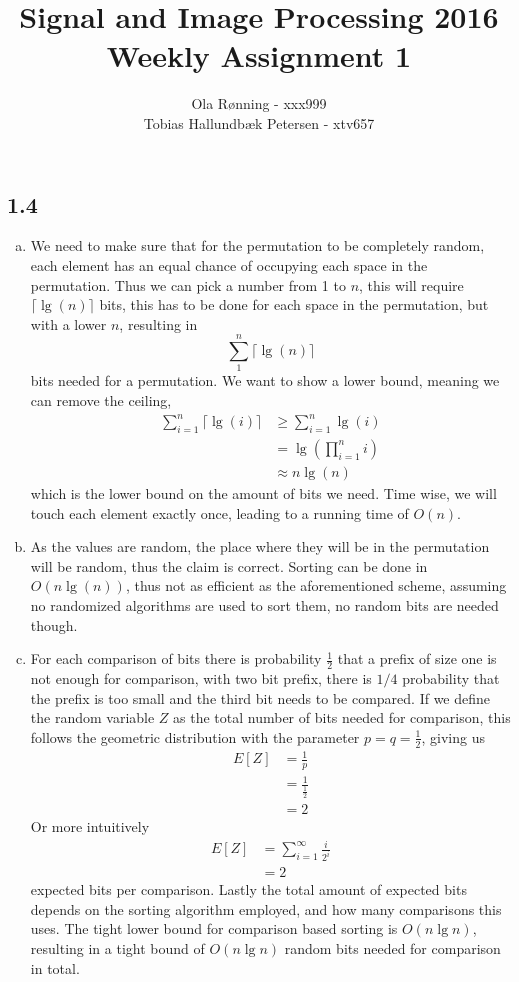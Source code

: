 \documentclass[a4paper]{article}
\title{Signal and Image Processing 2016\\Weekly Assignment 1}
\author{Ola Rønning - xxx999\\Tobias Hallundbæk Petersen - xtv657}
\begin{document}
\maketitle
\subsection*{1.4}
\begin{enumerate}[(a)]
  \item We need to make sure that for the permutation to be completely random, each element has an equal chance of occupying each space in the permutation. Thus we can pick a number from 1 to $n$, this will require $\lceil \lg(n)\rceil$ bits, this has to be done for each space in the permutation, but with a lower $n$, resulting in
    $$
    \sum^n_1 \lceil \lg(n) \rceil
    $$
    bits needed for a permutation. We want to show a lower bound, meaning we can remove the ceiling,
    \begin{align*}
      \sum^n_{i=1} \lceil \lg(i) \rceil &\geq \sum^n_{i=1} \lg(i)\\
                                        &= \lg\left(\prod_{i=1}^n i\right)\\
                                        &\approx n\lg(n)
    \end{align*}
    which is the lower bound on the amount of bits we need. Time wise, we will touch each element exactly once, leading to a running time of $O(n)$.
  \item As the values are random, the place where they will be in the permutation will be random, thus the claim is correct. Sorting can be done in $O(n\lg(n))$, thus not as efficient as the aforementioned scheme, assuming no randomized algorithms are used to sort them, no random bits are needed though.
  \item
    For each comparison of bits there is probability $\frac{1}{2}$ that a prefix of size one is not enough for comparison, with two bit prefix, there is $1/4$ probability that the prefix is too small and the third bit needs to be compared. If we define the random variable $Z$ as the total number of bits needed for comparison, this follows the geometric distribution with the parameter $p = q = \frac{1}{2}$, giving us
    \begin{align*}
      E[Z] &= \frac{1}{p}\\
           &= \frac{1}{\frac{1}{2}}\\
           &= 2
    \end{align*}
    Or more intuitively
    \begin{align*}
      E[Z] &= \sum_{i=1}^\infty \frac{i}{2^i}\\
           &= 2
    \end{align*}
    expected bits per comparison. Lastly the total amount of expected bits depends on the sorting algorithm employed, and how many comparisons this uses. The tight lower bound for comparison based sorting is $O(n\lg n)$, resulting in a tight bound of $O(n\lg n)$ random bits needed for comparison in total.
\end{enumerate}
\end{document}
